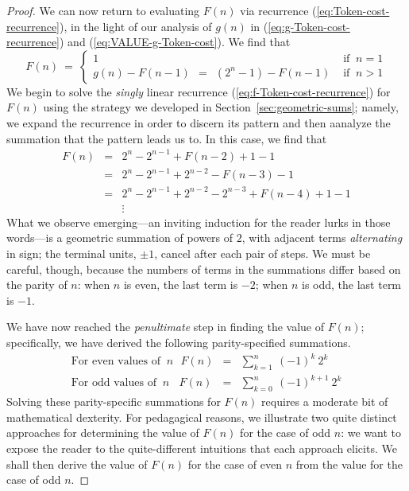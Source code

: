 \begin{proof}
We can now return to evaluating $F(n)$ via recurrence
(\ref{eq:Token-cost-recurrence}), in the light of our analysis of
$g(n)$ in (\ref{eq:g-Token-cost-recurrence}) and
(\ref{eq:VALUE-g-Token-cost}).  We find that 
\begin{equation}
\label{eq:f-Token-cost-recurrence}
F(n) \ = \ \left\{
\begin{array}{ll}
1 & \mbox{ if } \ n=1 \\
g(n) - F(n-1) \ \ = \ \
\left(2^{n} -1\right) - F(n-1) & \mbox{ if } \ n>1
\end{array}
\right.
\end{equation}
We begin to solve the {\em singly} linear recurrence
(\ref{eq:f-Token-cost-recurrence}) for $F(n)$ using the strategy we
developed in Section~\ref{sec:geometric-sums}; namely, we expand the
recurrence in order to discern its pattern and then aanalyze the
summation that the pattern leads us to.  In this case, we find that
\begin{eqnarray*}
F(n) & = & 2^{n} - 2^{n-1} + F(n-2) + 1 -1 \\
     & = & 2^{n} - 2^{n-1} + 2^{n-2} - F(n-3) -1 \\
     & = & 2^{n} - 2^{n-1} + 2^{n-2} - 2^{n-3} + F(n-4) +1-1 \\
     &   & \vdots
\end{eqnarray*}
What we observe emerging---an inviting induction for the reader lurks
in those words---is a geometric summation of powers of $2$, with
adjacent terms {\em alternating} in sign; the terminal units, $\pm 1$,
cancel after each pair of steps.  We must be careful, though, because
the numbers of terms in the summations differ based on the parity of
$n$: when $n$ is even, the last term is $-2$; when $n$ is odd, the
last term is $-1$.

We have now reached the {\em penultimate} step in finding the value of
$F(n)$; specifically, we have derived the following parity-specified
summations.
\begin{eqnarray}
\label{eq:EVEN-f-sum}
\mbox{For even values of } \ n \ \ \
F(n) & = &
\sum_{k=1}^n \ (-1)^{k} \ 2^{k} \\
\label{eq:ODD-f-sum}
\mbox{For odd values of } \ n \ \ \ \
F(n) & = &
\sum_{k=0}^n \ (-1)^{k+1} \ 2^{k}
\end{eqnarray}
Solving these parity-specific summations for $F(n)$ requires a
moderate bit of mathematical dexterity.  For pedagagical reasons, we
illustrate two quite distinct approaches for determining the value of
$F(n)$ for the case of odd $n$: we want to expose the reader to the
quite-different intuitions that each approach elicits.  We shall then
derive the value of $F(n)$ for the case of even $n$ from the value for
the case of odd $n$.


\end{proof}
